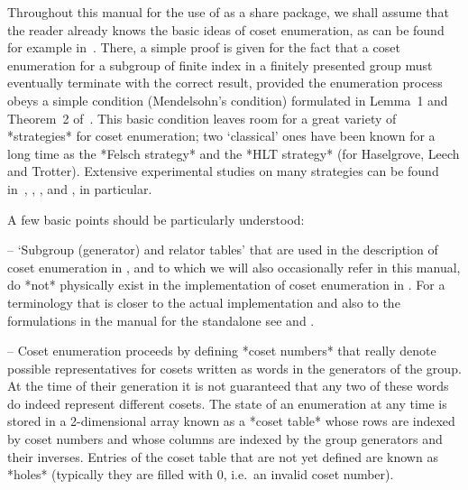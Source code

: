 

Throughout this manual for  the  use  of  {\ACE}  as  a  {\GAP}  share
package, we shall assume that the reader already knows the basic ideas
of coset enumeration, as can be  found  for  example  in~\cite{Neu82}.
There, a simple proof is given for the fact that a  coset  enumeration
for a subgroup of finite index in  a  finitely  presented  group  must
eventually terminate with the correct result, provided the enumeration
process obeys a simple condition (Mendelsohn's  condition)  formulated
in Lemma~1 and Theorem~2 of~\cite{Neu82}. This basic condition  leaves
room for a great variety  of  *strategies*  for  coset
enumeration; two \lq{}classical' ones have been known for a long  time
as the *Felsch  strategy*
and  the  *HLT  strategy*  (for
Haselgrove, Leech and Trotter). Extensive experimental studies on many
strategies can be found in~\cite{CDHW73}, \cite{Hav91},  \cite{HR99a},
and \cite{HR99b}, in particular.

A few basic points should be particularly understood:

\beginlist

\item{--} \lq{}Subgroup (generator) and relator tables' that are  used
in the description of coset enumeration in \cite{Neu82}, and to  which
we will also occasionally refer in this manual,  do  *not*  physically
exist in the implementation of coset  enumeration  in  {\ACE}.  For  a
terminology that is closer to the actual implementation  and  also  to
the  formulations  in  the  manual  for  the  {\ACE}  standalone   see
\cite{CDHW73} and \cite{Hav91}.

\item{--} Coset    enumeration    proceeds    by    defining    *coset
numbers*   that    really    denote    possible
representatives for cosets written as words in the generators  of  the
group. At the time of their generation it is not guaranteed  that  any
two of these words do indeed represent different cosets. The state  of
an enumeration at any time is stored in a 2-dimensional array known as
a *coset table* whose rows  are  indexed  by  coset
numbers and whose columns are indexed  by  the  group  generators  and
their inverses. Entries of the coset table that are  not  yet  defined
are known as *holes* (typically they are filled  with  0,
i.e.~an invalid coset number).

